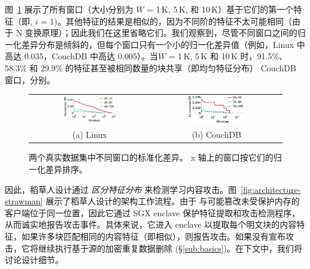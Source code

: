 图~\ref{fig:featureDistribution} 展示了所有窗口（大小分别为 $W$ = 1\,K, 5\,K, 和 10\,K）基于它们的第一个特征（即, $i$ = 1)。其他特征的结果是相似的，因为不同阶的特征不太可能相同（由于 N 变换原理）；因此我们在这里省略它们。我们观察到，尽管不同窗口之间的归一化差异分布是倾斜的，但每个窗口只有一个小的归一化差异值（例如，Linux 中高达 0.035，CouchDB 中高达 0.005）。当$W$ = 1\,K, 5\,K 和 10\,K 时，91.5\%、58.3\% 和 29.9\% 的特征甚至被相同数量的块共享（即均匀特征分布） CouchDB 窗口，分别。

\begin{figure}
  \centering
  \begin{tabular}{cc}
    \includegraphics[width=0.45\textwidth]{pic/featurespy/plot/featureDistribution/featureDistributionLinux.pdf} &
    \includegraphics[width=0.45\textwidth]{pic/featurespy/plot/featureDistribution/featureDistributionCouchbase.pdf} \\
    {\small (a) Linux} & {\small (b) CouchDB} \\
    \end{tabular}
  \vspace{-6pt}
  \caption{两个真实数据集中不同窗口的标准化差异。 x 轴上的窗口按它们的归一化差异排序。}
  \label{fig:featureDistribution}
  \vspace{-6pt}
\end{figure}

因此，稻草人设计通过 {\em 区分特征分布} 来检测学习内容攻击。图~\ref{fig:architecture-strawman} 展示了稻草人设计的架构工作流程。由于 \sysnameF 与可能篡改未受保护内存的客户端位于同一位置，因此它通过 SGX enclave 保护特征提取和攻击检测程序，从而诚实地报告攻击事件。具体来说，它进入 enclave 以提取每个明文块的内容特征，如果许多块匹配相同的内容特征（即相似），则报告攻击。如果没有宣布攻击，它将继续执行基于源的加密重复数据删除 (\S\ref{sub:basics})。在下文中，我们将讨论设计细节。


